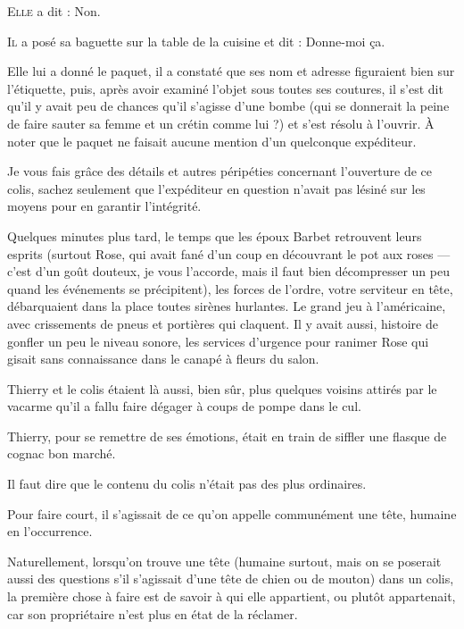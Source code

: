 \begin{dialogue}

\textsc{Elle} a dit : Non.

\textsc{Il} a posé sa baguette sur la table de la cuisine et dit : Donne-moi ça.

\end{dialogue}

Elle lui a donné le paquet, il a constaté que ses nom et adresse figuraient bien sur l’étiquette, puis, après avoir examiné l’objet sous toutes ses coutures, il s’est dit qu’il y avait peu de chances qu’il s’agisse d’une bombe (qui se donnerait la peine de faire sauter sa femme et un crétin comme lui ?) et s’est résolu à l’ouvrir. À noter que le paquet ne faisait aucune mention d’un quelconque expéditeur.

Je vous fais grâce des détails et autres péripéties concernant l’ouverture de ce colis, sachez seulement que l’expéditeur en question n’avait pas lésiné sur les moyens pour en garantir l’intégrité.

Quelques minutes plus tard, le temps que les époux Barbet retrouvent leurs esprits (surtout Rose, qui avait fané d’un coup en découvrant le pot aux roses — c’est d’un goût douteux, je vous l’accorde, mais il faut bien décompresser un peu quand les événements se précipitent), les forces de l’ordre, votre serviteur en tête, débarquaient dans la place toutes sirènes hurlantes. Le grand jeu à l’américaine, avec crissements de pneus et portières qui claquent. Il y avait aussi, histoire de gonfler un peu le niveau sonore, les services d’urgence pour ranimer Rose qui gisait sans connaissance dans le canapé à fleurs du salon.

Thierry et le colis étaient là aussi, bien sûr, plus quelques voisins attirés par le vacarme qu’il a fallu faire dégager à coups de pompe dans le cul.

Thierry, pour se remettre de ses émotions, était en train de siffler une flasque de cognac bon marché.

Il faut dire que le contenu du colis n’était pas des plus ordinaires.

Pour faire court, il s’agissait de ce qu’on appelle communément une tête, humaine en l’occurrence.

Naturellement, lorsqu’on trouve une tête (humaine surtout, mais on se poserait aussi des questions s’il s’agissait d’une tête de chien ou de mouton) dans un colis, la première chose à faire est de savoir à qui elle appartient, ou plutôt appartenait, car son propriétaire n’est plus en état de la réclamer.

